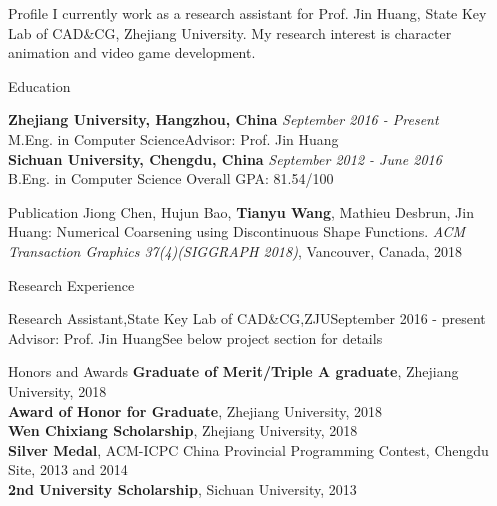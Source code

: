 \documentclass{resume} %
\begin{document}
\begin{rSection}{Profile}
I currently work as a research assistant for Prof. Jin Huang, State Key Lab of CAD\&CG, Zhejiang University. My research interest is character animation and video game development.
\end{rSection}

\begin{rSection}{Education}

{\bf Zhejiang University, Hangzhou, China} \hfill {\em September 2016 - Present} 
\\ M.Eng. in Computer Science\hfill {Advisor: Prof. Jin Huang} 
\\{\bf Sichuan University, Chengdu, China} \hfill {\em September 2012 - June 2016} 
\\ B.Eng. in Computer Science\hfill { Overall GPA: 81.54/100 }

\end{rSection}

\begin{rSection}{Publication}
Jiong Chen, Hujun Bao, \textbf{Tianyu Wang}, Mathieu Desbrun, Jin Huang: Numerical Coarsening using Discontinuous Shape Functions. \emph{ACM Transaction Graphics 37(4)(SIGGRAPH 2018)}, Vancouver, Canada, 2018
\end{rSection}


\begin{rSection}{Research Experience}

  \begin{rSubsection}{Research Assistant,State Key Lab of CAD\&CG,ZJU}{September 2016 - present}
    {Advisor: Prof. Jin Huang}{See below project section for details}
  \end{rSubsection}

\end{rSection}

\begin{rSection}{Honors and Awards}
  \textbf{Graduate of Merit/Triple A graduate}, Zhejiang University, 2018\\
  \textbf{Award of Honor for Graduate}, Zhejiang University, 2018\\
  \textbf{Wen Chixiang Scholarship}, Zhejiang University, 2018\\
  \textbf{Silver Medal}, ACM-ICPC China Provincial Programming Contest, Chengdu Site, 2013 and 2014\\
  \textbf{2nd University Scholarship}, Sichuan University, 2013
\end{rSection}
\end{document}
